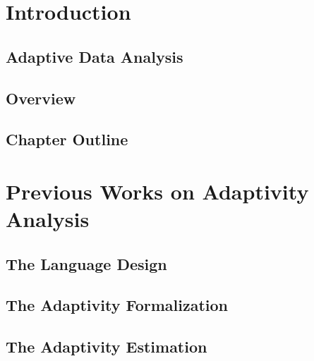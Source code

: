 \documentclass[12pt, letterpaper]{report}   %
\begin{document}
\chapter{Introduction}
\label{sec:adapt-intro}

\section{Adaptive Data Analysis}
\label{sec:adapt-background}


\section{Overview}
\label{sec:adapt-motivation}


\section{Chapter Outline}
\label{sec:adapt-outline}


\chapter{Previous Works on Adaptivity Analysis}
\label{sec:prework}

%
\section{The Language Design}
\label{sec:prework-language}

%
\section{The Adaptivity Formalization}
\label{sec:prework-formalization}

%
\section{The Adaptivity Estimation}
\label{sec:prework-static}





\end{document}

